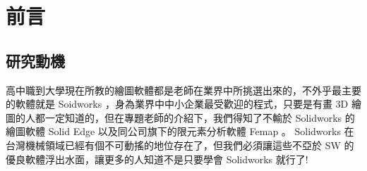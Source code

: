 \chapter{前言}
\renewcommand{\baselinestretch}{10.0} %
\setcounter{page}{1}  %
\fontsize{14pt}{2.5pt}\sectionef
\section{研究動機}
高中職到大學現在所教的繪圖軟體都是老師在業界中所挑選出來的，不外乎最主要的軟體就是 Soidworks ，身為業界中中小企業最受歡迎的程式，只要是有畫 3D 繪圖的人都一定知道的，但在專題老師的介紹下，我們得知了不輸於 Solidworks 的繪圖軟體 Solid Edge 以及同公司旗下的限元素分析軟體 Femap 。 Solidworks 在台灣機械領域已經有個不可動搖的地位存在了，但我們必須讓這些不亞於 SW 的優良軟體浮出水面，讓更多的人知道不是只要學會 Solidworks 就行了!\\

